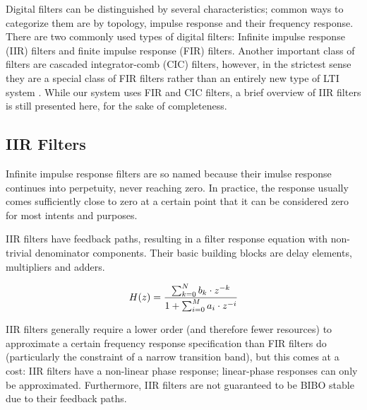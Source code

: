 Digital filters can  be distinguished by several  characteristics; common ways
to  categorize them  are by  topology,  impulse response  and their  frequency
response. There  are  two commonly  used  types  of digital  filters: Infinite
impulse   response   (IIR)  filters   and   finite   impulse  response   (FIR)
filters. Another important class of filters are cascaded integrator-comb (CIC)
filters,  however, in  the strictest  sense they  are a  special class  of FIR
filters rather than an entirely new  type of LTI system \cite{1163535}.  While
our system uses FIR and CIC filters,  a brief overview of IIR filters is still
presented here, for the sake of completeness.
%
%
\subsection{IIR Filters} %
\label{subsec:iir_filters}

Infinite impulse response  filters are so named because  their imulse response
continues  into perpetuity,  never  reaching zero. In  practice, the  response
usually comes  sufficiently close to  zero at a certain  point that it  can be
considered zero for most intents and purposes.

IIR filters have feedback paths, resulting  in a filter response equation with
non-trivial  denominator components. Their  basic  building  blocks are  delay
elements, multipliers and adders.

\begin{equation}
    \label{eq:iir_filter}
    H(z) = \frac{%
            \sum_{k=0}^N b_k \cdot z^{-k}}{%
            1 + \sum_{i=0}^M a_i \cdot z^{-i}}
\end{equation}

IIR filters generally require a lower order (and therefore fewer resources) to
approximate a  certain frequency  response specification  than FIR  filters do
(particularly the constraint of a narrow transition band), but this comes at a
cost:  IIR  filters have a  non-linear phase response;  linear-phase responses
can only  be approximated. Furthermore, IIR  filters are not guaranteed  to be
BIBO stable due to their feedback paths.

